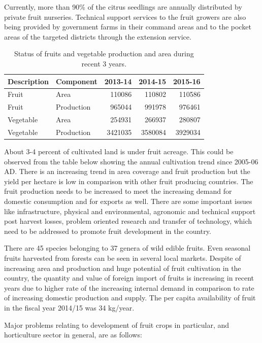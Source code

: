 \documentclass[
]{book}
\begin{document}
Currently, more than 90\% of the citrus seedlings are annually distributed by private fruit nurseries. Technical support services to the fruit growers are also being provided by government farms in their command areas and to the pocket areas of the targeted districts through the extension service.

\begin{table}

\caption{\label{tab:horticulture-fruits-veg}Status of fruits and vegetable production and area during recent 3 years.}
\centering
\begin{tabular}[t]{llrrr}
\toprule
Description & Component & 2013-14 & 2014-15 & 2015-16\\
\midrule
Fruit & Area & 110086 & 110802 & 110586\\
Fruit & Production & 965044 & 991978 & 976461\\
Vegetable & Area & 254931 & 266937 & 280807\\
Vegetable & Production & 3421035 & 3580084 & 3929034\\
\bottomrule
\end{tabular}
\end{table}

About 3-4 percent of cultivated land is under fruit acreage. This could be observed from the table below showing the annual cultivation trend since 2005-06 AD. There is an increasing trend in area coverage and fruit production but the yield per hectare is low in comparison with other fruit producing countries. The fruit production needs to be increased to meet the increasing demand for domestic consumption and for exports as well. There are some important issues like infrastructure, physical and environmental, agronomic and technical support post harvest losses, problem oriented research and transfer of technology, which need to be addressed to promote fruit development in the country.

There are 45 species belonging to 37 genera of wild edible fruits. Even seasonal fruits harvested from forests can be seen in several local markets. Despite of increasing area and production and huge potential of fruit cultivation in the country, the quantity and value of foreign import of fruits is increasing in recent years due to higher rate of the increasing internal demand in comparison to rate of increasing domestic production and supply. The per capita availability of fruit in the fiscal year 2014/15 was 34 kg/year.

Major problems relating to development of fruit crops in particular, and horticulture sector in general, are as follows:
\end{document}
